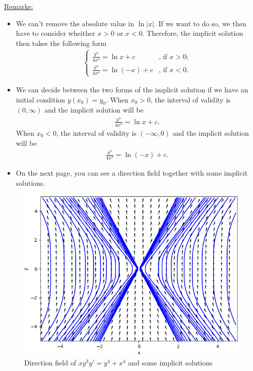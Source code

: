 \documentclass[12pt]{article}
\begin{document}
	\underline{Remarks:}
		\begin{itemize}
		\item We can't remove the absolute value in $\ln |x|$. If we want to do so, we then have to consider wheither $x > 0$ or $x < 0$. Therefore, the implicit solution then takes the following form
			\begin{align*}
			\left\{ \begin{matrix}
			\frac{y^4}{4 x^4} = \ln x + c & \text{, if } x > 0 \text{;} \\
			\frac{y^4}{4 x^4} = \ln (-x) + c & \text{, if } x < 0 \text{.}
			\end{matrix} \right.
			\end{align*}
		\item We can decide between the two forms of the implicit solution if we have an initial condition $y(x_0) = y_0$. When $x_0 > 0$, the interval of validity is $(0, \infty )$ and the implicit solution will be
			\begin{align*}
			\frac{y^4}{4 x^4} = \ln x + c .
			\end{align*}
		When $x_0 < 0$, the interval of validity is $(-\infty , 0 )$ and the implicit solution will be
			\begin{align*}
			\frac{y^4}{4 x^4} = \ln (-x) + c .
			\end{align*}
		\item On the next page, you can see a direction field together with some implicit solutions.
		\end{itemize}
		
	\begin{figure}
	\centering
	\includegraphics[scale=1]{figure_1.png}
	\caption{Direction field of $xy^3 y' = y^4 + x^4$ and some implicit solutions}
	\end{figure}
	
\end{document}
